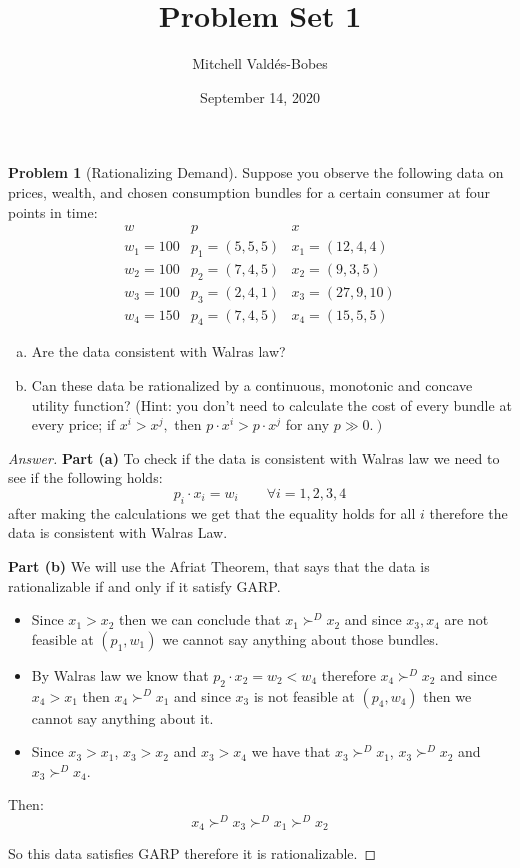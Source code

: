 \documentclass{article}
\title{Problem Set 1}
\author{Mitchell Valdés-Bobes}
\date{September 14, 2020}
\theoremstyle{definition}
\newtheorem{problem}{Problem}
\begin{document}
\maketitle
\begin{problem}[Rationalizing Demand]
Suppose you observe the following data on prices, wealth, and chosen consumption bundles for a
certain consumer at four points in time:
$$
\begin{array}{ccc}
w & p & x \\
\hline w_1 = 100 & p_1= (5,5,5) & x_1 = (12,4,4) \\
w_2 = 100 & p_2= (7,4,5) & x_2 = (9,3,5) \\
w_3 =  100 & p_3= (2,4,1) & x_3 = (27,9,10) \\
w_4 = 150 & p_4= (7,4,5) & x_4 = (15,5,5)
\end{array}
$$
\begin{enumerate}[(a)]
    \item Are the data consistent with Walras law?
    \item Can these data be rationalized by a continuous, monotonic and concave utility function? (Hint: you don't need to calculate the cost of every bundle at every price; if $x^{i}>x^{j},$ then $p \cdot x^{i}>p \cdot x^{j}$ for any $\left.p \gg 0 .\right)$
\end{enumerate}

\end{problem}

\begin{proof}[Answer]
\textbf{Part (a)} To check if the data is consistent with Walras law we need to see if the following holds:
$$p_i \cdot x_i = w_i \qquad \forall i=1,2,3,4$$
after making the calculations we get that the equality holds for all $i$ therefore the data is consistent with Walras Law.

\textbf{Part (b)}
We will use the Afriat Theorem, that says that the data is rationalizable if and only if it satisfy GARP.
\begin{itemize}
    \item Since $x_1>x_2$ then we can conclude that $x_1\succ^D x_2$ and since $x_3, x_4$ are not feasible at $(p_1,w_1)$ we cannot say anything about those bundles.
    \item By Walras law we know that $p_2\cdot x_2 = w_2 < w_4$ therefore $x_4\succ^D x_2$ and since $x_4>x_1$ then $x_4\succ^D x_1$ and since $x_3$ is not feasible at $(p_4,w_4)$ then we cannot say anything about it.
    \item Since $x_3>x_1$,  $x_3>x_2$ and  $x_3>x_4$ we have that $x_3 \succ^D x_1$, $x_3 \succ^D x_2$ and $x_3\succ^D x_4$.
\end{itemize}

Then:
$$x_4 \succ^D x_3 \succ^D x_1 \succ^D x_2$$

So this data satisfies GARP therefore it is rationalizable.

\end{proof}
\end{document}
